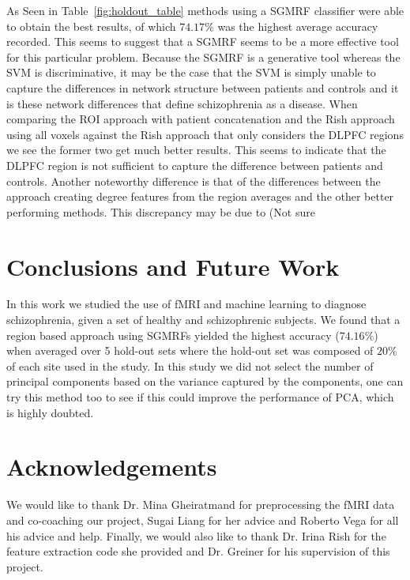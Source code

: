 \documentclass{article} %
\begin{document}
As Seen in Table~\ref{fig:holdout_table} methods using a SGMRF classifier were
able to obtain the best results, of which $74.17\%$ was the highest average
accuracy recorded. This seems to suggest that a SGMRF seems to be a more
effective tool for this particular problem. Because the SGMRF is a generative
tool whereas the SVM is discriminative, it may be the case that the SVM is
simply unable to capture the differences in network structure between patients
and controls and it is these network differences that define schizophrenia as
a disease. When comparing the ROI approach with patient concatenation and the
Rish approach using all voxels against the Rish approach that only considers
the DLPFC regions we see the former two get much better results. This seems
to indicate that the DLPFC region is not sufficient to capture the difference
between patients and controls. Another noteworthy difference is that of the
differences between the approach creating degree features from the region
averages and the other better performing methods. This discrepancy may be due
to (Not sure %


\section{Conclusions and Future Work}
In this work we studied the use of fMRI and machine learning to diagnose
schizophrenia, given a set of healthy and schizophrenic subjects. We found
that a region based approach using SGMRFs yielded the highest accuracy 
($74.16\%$) when averaged over 5 hold-out sets where the hold-out set was
composed of $20\%$ of each site used in the study. In this study we did not select the number of principal components based on the variance captured by the components, one can try this method too to see if this could improve the performance of PCA, which is highly doubted. 

\section{Acknowledgements}
We would like to thank Dr. Mina Gheiratmand for preprocessing the fMRI data 
and co-coaching our project, Sugai Liang for her advice and Roberto Vega for
all his advice and help. Finally, we would also like to thank Dr. Irina Rish
for the feature extraction code she provided and Dr. Greiner for his
supervision of this project.




	
\end{document}
